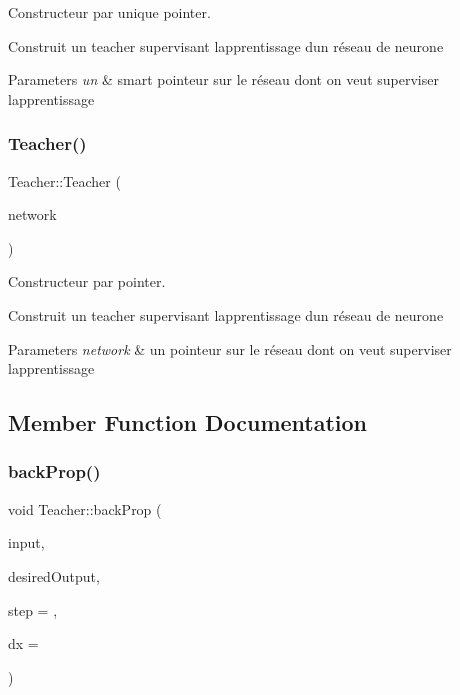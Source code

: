 Constructeur par unique pointer. 

Construit un teacher supervisant l\textquotesingle{}apprentissage d\textquotesingle{}un réseau de neurone 
\begin{DoxyParams}{Parameters}
{\em un} & smart pointeur sur le réseau dont on veut superviser l\textquotesingle{}apprentissage \\
\hline
\end{DoxyParams}
\mbox{\label{classTeacher_afd32ab70242f2c5886d030a5e7d05919}} 
\subsubsection{\texorpdfstring{Teacher()}{Teacher()}\hspace{0.1cm}{\footnotesize\ttfamily [2/2]}}
{\footnotesize\ttfamily Teacher\+::\+Teacher (\begin{DoxyParamCaption}\item[{\hyperlink{classNeuralNetwork}{Neural\+Network} $\ast$}]{network }\end{DoxyParamCaption})}



Constructeur par pointer. 

Construit un teacher supervisant l\textquotesingle{}apprentissage d\textquotesingle{}un réseau de neurone 
\begin{DoxyParams}{Parameters}
{\em network} & un pointeur sur le réseau dont on veut superviser l\textquotesingle{}apprentissage \\
\hline
\end{DoxyParams}


\subsection{Member Function Documentation}
\mbox{\label{classTeacher_a038afb323ffc518a3a3af5044f931442}} 
\subsubsection{\texorpdfstring{back\+Prop()}{backProp()}}
{\footnotesize\ttfamily void Teacher\+::back\+Prop (\begin{DoxyParamCaption}\item[{Eigen\+::\+Vector\+Xf}]{input,  }\item[{Eigen\+::\+Vector\+Xf}]{desired\+Output,  }\item[{float}]{step = {},  }\item[{float}]{dx = {} }\end{DoxyParamCaption})}



